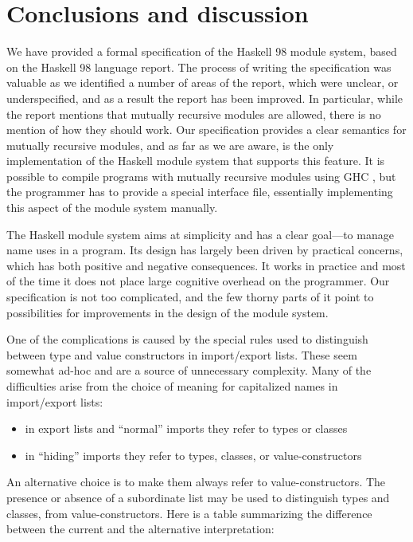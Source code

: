 \section{Conclusions and discussion}
\label{conclusions}

We have provided a formal specification of the Haskell 98 module system,
based on the Haskell 98 language report.
The process of writing the specification was valuable as we
identified a number of areas of the report, which were unclear, or 
underspecified, and as a result the report has been improved.  In particular, 
while the report mentions that mutually recursive modules are 
allowed, there is no mention of how they should work.   
Our specification provides a clear semantics for
mutually recursive modules, and as far as we are aware, is the only
implementation of the Haskell module system that supports this feature.
It is possible to compile programs with mutually recursive modules 
using GHC \cite[Section 4.9.7]{GHC-ref-man}, but the programmer
has to provide a special interface file, essentially implementing
this aspect of the module system manually. 


The Haskell module system aims at simplicity and has a clear goal---to manage
name uses in a program.  Its design has largely been driven by practical
concerns, which has both positive and negative consequences.  It works in 
practice and most of the time it does not place large cognitive
overhead on the programmer.  Our specification is not too complicated,
and the few thorny parts of it point to possibilities for improvements
in the design of the module system.

One of the complications is caused by the
special rules used to distinguish between type and value constructors in 
import/export lists. These seem somewhat ad-hoc and are a source of
unnecessary complexity.  Many of the 
difficulties arise from the choice of meaning for capitalized names
in import/export lists: 
\begin{itemize}
    \item in export lists and ``normal'' imports they refer to types or classes
    \item in ``hiding'' imports they refer to types, classes, or 
        value-constructors 
\end{itemize}
An alternative choice is to make them always refer to value-constructors.
The presence or absence of a subordinate list may be used to 
distinguish types and classes, from value-constructors. Here is a table 
summarizing the difference between the current and the alternative 
interpretation:

